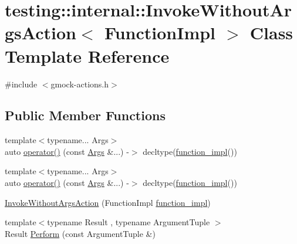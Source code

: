 \hypertarget{structtesting_1_1internal_1_1_invoke_without_args_action}{}\section{testing\+::internal\+::Invoke\+Without\+Args\+Action$<$ Function\+Impl $>$ Class Template Reference}
\label{structtesting_1_1internal_1_1_invoke_without_args_action}


{\ttfamily \#include $<$gmock-\/actions.\+h$>$}

\subsection*{Public Member Functions}
\begin{DoxyCompactItemize}
\item 
{\footnotesize template$<$typename... Args$>$ }\\auto \mbox{\hyperlink{structtesting_1_1internal_1_1_invoke_without_args_action_adc01090fc14c0e63b1ed81e8a0d04fc4}{operator()}} (const \mbox{\hyperlink{namespacetesting_aaca153f67b689b8b9d5b8c67ecf8cee4}{Args}} \&...) -\/$>$ decltype(\mbox{\hyperlink{structtesting_1_1internal_1_1_invoke_without_args_action_a60320725a70c43f3257264ffc905fd71}{function\+\_\+impl}}())
\item 
{\footnotesize template$<$typename... Args$>$ }\\auto \mbox{\hyperlink{structtesting_1_1internal_1_1_invoke_without_args_action_adc01090fc14c0e63b1ed81e8a0d04fc4}{operator()}} (const \mbox{\hyperlink{namespacetesting_aaca153f67b689b8b9d5b8c67ecf8cee4}{Args}} \&...) -\/$>$ decltype(\mbox{\hyperlink{structtesting_1_1internal_1_1_invoke_without_args_action_a60320725a70c43f3257264ffc905fd71}{function\+\_\+impl}}())
\item 
\mbox{\hyperlink{structtesting_1_1internal_1_1_invoke_without_args_action_a05d4006d8ab70e78172bf678b1d15f18}{Invoke\+Without\+Args\+Action}} (Function\+Impl \mbox{\hyperlink{structtesting_1_1internal_1_1_invoke_without_args_action_a60320725a70c43f3257264ffc905fd71}{function\+\_\+impl}})
\item 
{\footnotesize template$<$typename Result , typename Argument\+Tuple $>$ }\\Result \mbox{\hyperlink{structtesting_1_1internal_1_1_invoke_without_args_action_abdad2b7d19ff1cbd1d07a4bd585e3f4c}{Perform}} (const Argument\+Tuple \&)
\end{DoxyCompactItemize}
